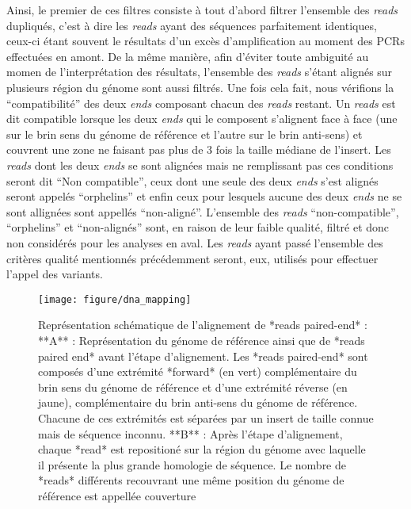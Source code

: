 \documentclass[12pt,twoside]{reedthesis}
\theoremstyle{definition}
\theoremstyle{definition}
\theoremstyle{remark}
\begin{document}
  Ainsi, le premier de ces filtres consiste à tout d'abord filtrer
  l'ensemble des \emph{reads} dupliqués, c'est à dire les \emph{reads}
  ayant des séquences parfaitement identiques, ceux-ci étant souvent le
  résultats d'un excès d'amplification au moment des PCRs effectuées en
  amont. De la même manière, afin d'éviter toute ambiguité au momen de
  l'interprétation des résultats, l'ensemble des \emph{reads} s'étant
  alignés sur plusieurs région du génome sont aussi filtrés. Une fois cela
  fait, nous vérifions la ``compatibilité'' des deux \emph{ends} composant
  chacun des \emph{reads} restant. Un \emph{reads} est dit compatible
  lorsque les deux \emph{ends} qui le composent s'alignent face à face
  (une sur le brin sens du génome de référence et l'autre sur le brin
  anti-sens) et couvrent une zone ne faisant pas plus de 3 fois la taille
  médiane de l'insert. Les \emph{reads} dont les deux \emph{ends} se sont
  alignées mais ne remplissant pas ces conditions seront dit ``Non
  compatible'', ceux dont une seule des deux \emph{ends} s'est alignés
  seront appelés ``orphelins'' et enfin ceux pour lesquels aucune des deux
  \emph{ends} ne se sont allignées sont appellés ``non-aligné''.
  L'ensemble des \emph{reads} ``non-compatible'', ``orphelins'' et
  ``non-alignés'' sont, en raison de leur faible qualité, filtré et donc
  non considérés pour les analyses en aval. Les \emph{reads} ayant passé
  l'ensemble des critères qualité mentionnés précédemment seront, eux,
  utilisés pour effectuer l'appel des variants.
  
  \newpage
  
  \begin{figure}
  
  {\centering \texttt{[image: figure/dna\_mapping]} 
  
  }
  
  \caption{Représentation schématique de l'alignement de *reads paired-end* : **A** : Représentation du génome de référence ainsi que de *reads paired end* avant l'étape d'alignement. Les *reads paired-end* sont composés d'une extrémité *forward* (en vert) complémentaire du brin sens du génome de référence et d'une extrémité réverse (en jaune), complémentaire du brin anti-sens du génome de référence. Chacune de ces extrémités est séparées par un insert de taille connue mais de séquence inconnu. **B** : Après l'étape d'alignement, chaque *read* est repositioné sur la région du génome avec laquelle il présente la plus grande homologie de séquence. Le nombre de *reads* différents recouvrant une même position du génome de référence est appellée couverture}\label{fig:picdnamapping}
  \end{figure}
  
\end{document}
